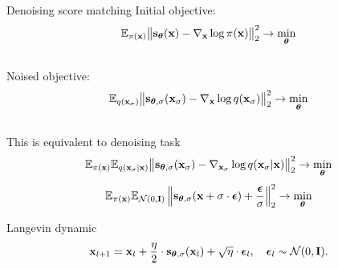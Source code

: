 \begin{frame}{Denoising score matching}
	Initial objective:
	\vspace{-0.2cm}
	\[
		\mathbb{E}_{\pi(\mathbf{x})}\bigl\| \mathbf{s}_{\boldsymbol{\theta}}(\mathbf{x}) - \nabla_{\mathbf{x}} \log \pi(\mathbf{x}) \bigr\|^2_2 \rightarrow \min_{\boldsymbol{\theta}}
	\]
	\vspace{-0.5cm} \\
	Noised objective:
	\vspace{-0.2cm}
	\[
		\mathbb{E}_{q(\mathbf{x}_{\sigma})}\bigl\| \mathbf{s}_{\boldsymbol{\theta}, \sigma}(\mathbf{x}_\sigma) - \nabla_{\mathbf{x}} \log q(\mathbf{x}_{\sigma}) \bigr\|^2_2 \rightarrow \min_{\boldsymbol{\theta}}
	\]
	\vspace{-0.5cm} \\
	This is equivalent to denoising task
	\vspace{-0.2cm}
	\[
		\mathbb{E}_{\pi(\mathbf{x})} \mathbb{E}_{q(\mathbf{x}_{\sigma} | \mathbf{x})}\bigl\| \mathbf{s}_{\boldsymbol{\theta}, \sigma}(\mathbf{x}_{\sigma}) - \nabla_{\mathbf{x}_{\sigma}} \log q(\mathbf{x}_{\sigma} | \mathbf{x}) \bigr\|^2_2 \rightarrow \min_{\boldsymbol{\theta}}
	\]
	\vspace{-0.3cm}
	\[
		\mathbb{E}_{\pi(\mathbf{x})} \mathbb{E}_{\mathcal{N}(0, \mathbf{I})}\left\| \mathbf{s}_{\boldsymbol{\theta}, \sigma}(\mathbf{x} + \sigma \cdot \boldsymbol{\epsilon}) + \frac{\boldsymbol{\epsilon}}{\sigma} \right\|^2_2 \rightarrow \min_{\boldsymbol{\theta}}
	\]
	\vspace{-0.5cm}
	\begin{block}{Langevin dynamic}
		\vspace{-0.3cm}
		\[
			\mathbf{x}_{l + 1} = \mathbf{x}_l + \frac{\eta}{2} \cdot \mathbf{s}_{\boldsymbol{\theta}, \sigma}(\mathbf{x}_l) + \sqrt{\eta} \cdot \boldsymbol{\epsilon}_l, \quad \boldsymbol{\epsilon}_l \sim \mathcal{N}(0, \mathbf{I}).
		\]
		\vspace{-0.7cm}
	\end{block}
\end{frame}
